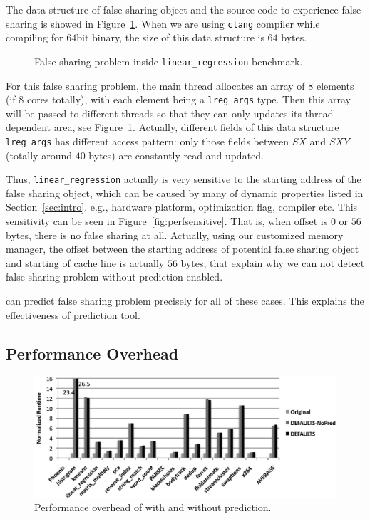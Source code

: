 The data structure of false sharing object and the source code
to experience false sharing is showed in Figure~\ref{fig:linearregression}. 
When we are using \texttt{clang} compiler while compiling for $64$bit binary, the size of this 
data structure is $64$ bytes.

\begin{figure}[!h]
{\centering
\subfigure{}
\caption{False sharing problem inside \texttt{linear\_regression} benchmark.
\label{fig:linearregression}}
}
\end{figure}

For this false sharing problem, the main thread allocates an array of $8$ elements 
(if $8$ cores totally), 
with each element being a \texttt{lreg\_args} type. 
Then this array will be passed to different threads so that they can only updates its 
thread-dependent area, see Figure~\ref{fig:linearregression}.
Actually, different fields of this data structure \texttt{lreg\_args} has different access pattern:
only those fields between $SX$ and $SXY$ (totally around $40$ bytes) are constantly read and updated.

Thus, \texttt{linear\_regression} actually is very sensitive to the starting address 
of the false sharing object, which can be caused by many of dynamic properties 
listed in Section~\ref{sec:intro}, e.g.,
hardware platform, optimization flag, compiler etc.
This sensitivity can be seen in Figure~\ref{fig:perfsensitive}.
That is, when offset is $0$ or $56$ bytes, there is no false sharing at all.
Actually, using our customized memory manager,
the offset between the starting address of potential false sharing object 
and starting of cache line is actually $56$ bytes,
that explain why we can not detect false sharing problem without prediction enabled.

\Predator{} can predict false sharing problem precisely for all of these cases. This explains
the effectiveness of prediction tool.

\subsection{Performance Overhead}
\label{sec:perfoverhead}

\begin{figure}[!ht]
\begin{center}
\includegraphics[width=6.5in]{fig/perf}
\end{center}
\caption{
Performance overhead of \Predator{} with and without prediction.
\label{fig:perf}}
\end{figure}

